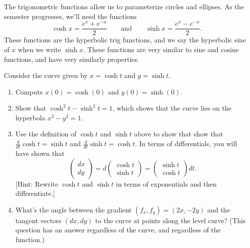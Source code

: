 The trigonometric functions allow us to parameterize circles and ellipses. 
As the semester progresses, we'll need the functions 
$$\cosh x = \frac{e^x+e^{-x}}{2}\quad\quad \text{and}\quad \quad  \sinh x= \frac{e^x-e^{-x}}{2}.$$  
These functions are the hyperbolic trig functions, and we say the hyperbolic sine of $x$ when we write $\sinh x$.
These functions are very similar to sine and cosine functions, and have very similarly properties.  


\begin{problem}
Consider the curve given by $x=\cosh t$ and $y=\sinh t$.
\begin{enumerate}
 \item 
Compute $x(0) = \cosh(0)$ and $y(0)=\sinh(0)$.
 \item 
{}%
 Show that $\cosh^2 t-\sinh^2t=1$, which shows that the curve lies on the hyperbola $x^2-y^2=1$. 
 \item Use the definition of $\cosh t$ and $\sinh t$ above to show that show that $\frac{d}{dt}\cosh t = \sinh t$ and $\frac{d}{dt}\sinh t = \cosh t$.
In terms of differentials, you will have shown that 
$$
\begin{pmatrix}
 dx\\dy
\end{pmatrix}
=
d\begin{pmatrix}
 \cosh t\\ \sinh t
\end{pmatrix}
=
\begin{pmatrix}
 \sinh t\\ \cosh t
\end{pmatrix}dt.$$ 
[Hint: Rewrite $\cosh t$ and $\sinh t$ in terms of exponentials and then differentiate.]
\item What's the angle between the gradient $(f_x, f_y) = (2x,-2y)$ and the tangent vectors $(dx,dy)$ to the curve at points along the level curve? (This question has an answer regardless of the curve, and regardless of the function.)
\end{enumerate}

\end{problem}




